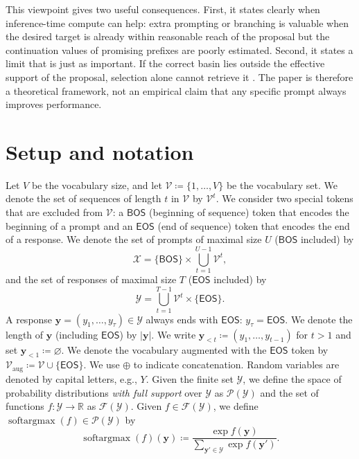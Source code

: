 \documentclass[aps,pre,reprint,superscriptaddress,nofootinbib]{revtex4-2}
\newcommand{\RR}{\mathbb{R}}
\newcommand{\voc}{\mathcal{V}}
\newcommand{\bos}{\mathsf{BOS}}
\newcommand{\eos}{\mathsf{EOS}}
\newcommand{\cX}{\mathcal{X}}
\newcommand{\cY}{\mathcal{Y}}
\newcommand{\augvoc}{\mathcal{V}_{\mathrm{aug}}}
\newcommand{\cP}{\mathcal{P}}
\newcommand{\cF}{\mathcal{F}}
\newcommand{\y}{\mathbf{y}}
\newcommand{\softargmax}{\operatorname{softargmax}}
\begin{document}
This viewpoint gives two useful consequences.
First, it states clearly when inference-time compute can help: extra prompting or branching is valuable when the desired target is already within reasonable reach of the proposal but the continuation values of promising prefixes are poorly estimated.
Second, it states a limit that is just as important.
If the correct basin lies outside the effective support of the proposal, selection alone cannot retrieve it \cite{mukherjee2025test}.
The paper is therefore a theoretical framework, not an empirical claim that any specific prompt always improves performance.

\section{Setup and notation}

Let $V$ be the vocabulary size, and let $\voc \coloneqq \{1, \ldots, V\}$ be the vocabulary set.
We denote the set of sequences of length $t$ in $\voc$ by $\voc^t$.
We consider two special tokens that are excluded from $\voc$: a $\bos$ (beginning of sequence) token that encodes the beginning of a prompt and an $\eos$ (end of sequence) token that encodes the end of a response.
We denote the set of prompts of maximal size $U$ ($\bos$ included) by
\begin{equation}
\cX = \{\bos\} \times \bigcup_{t=1}^{U-1} \voc^t,
\end{equation}
and the set of responses of maximal size $T$ ($\eos$ included) by
\begin{equation}
\cY = \bigcup_{t=1}^{T-1} \voc^t \times \{\eos\}.
\end{equation}
A response $\y = (y_1, \dots, y_\tau) \in \cY$ always ends with $\eos$: $y_\tau = \eos$.
We denote the length of $\y$ (including $\eos$) by $|\y|$.
We write $\y_{<t} \coloneqq (y_1, \ldots, y_{t-1})$ for $t > 1$ and set $\y_{<1} \coloneqq \varnothing$.
We denote the vocabulary augmented with the $\eos$ token by $\augvoc \coloneqq \voc \cup \{\eos\}$.
We use $\oplus$ to indicate concatenation.
Random variables are denoted by capital letters, e.g., $Y$.
Given the finite set $\cY$, we define the space of probability distributions \emph{with full support} over $\cY$ as $\cP(\cY)$ and the set of functions $f \colon \cY \to \RR$ as $\cF(\cY)$.
Given $f \in \cF(\cY)$, we define $\softargmax(f) \in \cP(\cY)$ by
\begin{equation}
\softargmax(f)(\y) \coloneqq \frac{\exp f(\y)}{\sum_{\y' \in \cY} \exp f(\y')}.
\end{equation}
\end{document}
